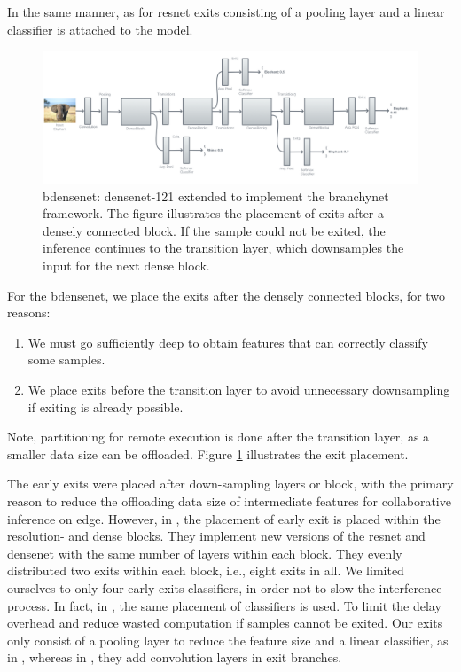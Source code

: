 In the same manner, as for \gls{resnet} exits consisting of a pooling layer and a linear classifier is attached to the model.
\begin{figure}
	\centering
	\includegraphics[width=\linewidth]{figures/models/b-densenet}
	\caption[B-\gls{densenet} architecture]{\gls{bdensenet}: \gls{densenet}-121 extended to implement the \gls{branchynet} framework. The figure illustrates the placement of exits after a densely connected block. If the sample could not be exited, the inference continues to the transition layer, which downsamples the input for the next dense block. }
	\label{fig:b-densenet}
\end{figure}
For the \gls{bdensenet}, we place the exits after the densely connected blocks, for two reasons: 
\begin{enumerate}
	\item We must go sufficiently deep to obtain features that can correctly classify some samples.
	\item We place exits before the transition layer to avoid unnecessary downsampling if exiting is already possible. 
\end{enumerate}
Note, partitioning for remote execution is done after the transition layer, as a smaller data size can be offloaded. Figure \ref{fig:b-densenet} illustrates the exit placement.

The early exits were placed after down-sampling layers or block, with the primary reason to reduce the offloading data size of intermediate features for collaborative inference on edge. However, in \cite{huang_multi-scale_2017}, the placement of early exit is placed within the resolution- and dense blocks. They implement new versions of the \gls{resnet} and \gls{densenet} with the same number of layers within each block. They evenly distributed two exits within each block, i.e., eight exits in all. We limited ourselves to only four early exits classifiers, in order not to slow the interference process. In fact, in \cite{berestizshevsky_sacrificing_2019}, the same placement of classifiers is used. To limit the delay overhead and reduce wasted computation if samples cannot be exited. Our exits only consist of a pooling layer to reduce the feature size and a linear classifier, as in \cite{kaya_shallow-deep_nodate}, whereas in \cite{teerapittayanon_branchynet:_2016}, they add convolution layers in exit branches. 


